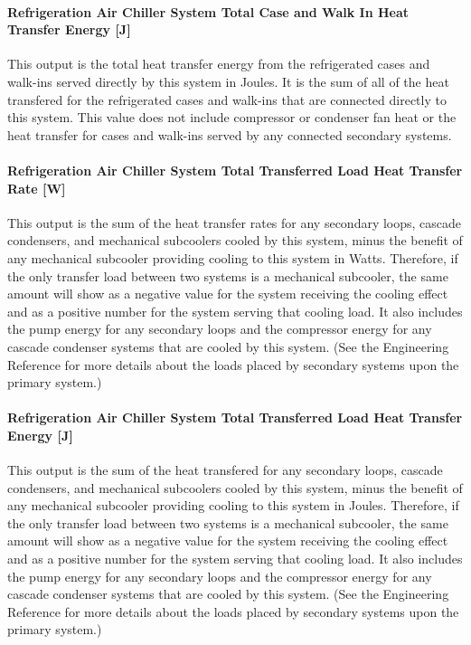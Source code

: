 \paragraph{Refrigeration Air Chiller System Total Case and Walk In Heat Transfer Energy {[}J{]}}\label{refrigeration-air-chiller-system-total-case-and-walk-in-heat-transfer-energy-j}

This output is the total heat transfer energy from the refrigerated cases and walk-ins served directly by this system in Joules. It is the sum of all of the heat transfered for the refrigerated cases and walk-ins that are connected directly to this system. This value does not include compressor or condenser fan heat or the heat transfer for cases and walk-ins served by any connected secondary systems.

\paragraph{Refrigeration Air Chiller System Total Transferred Load Heat Transfer Rate {[}W{]}}\label{refrigeration-air-chiller-system-total-transferred-load-heat-transfer-rate-w}

This output is the sum of the heat transfer rates for any secondary loops, cascade condensers, and mechanical subcoolers cooled by this system, minus the benefit of any mechanical subcooler providing cooling to this system in Watts. Therefore, if the only transfer load between two systems is a mechanical subcooler, the same amount will show as a negative value for the system receiving the cooling effect and as a positive number for the system serving that cooling load. It also includes the pump energy for any secondary loops and the compressor energy for any cascade condenser systems that are cooled by this system. (See the Engineering Reference for more details about the loads placed by secondary systems upon the primary system.)

\paragraph{Refrigeration Air Chiller System Total Transferred Load Heat Transfer Energy {[}J{]}}\label{refrigeration-air-chiller-system-total-transferred-load-heat-transfer-energy-j}

This output is the sum of the heat transfered for any secondary loops, cascade condensers, and mechanical subcoolers cooled by this system, minus the benefit of any mechanical subcooler providing cooling to this system in Joules. Therefore, if the only transfer load between two systems is a mechanical subcooler, the same amount will show as a negative value for the system receiving the cooling effect and as a positive number for the system serving that cooling load. It also includes the pump energy for any secondary loops and the compressor energy for any cascade condenser systems that are cooled by this system. (See the Engineering Reference for more details about the loads placed by secondary systems upon the primary system.)

